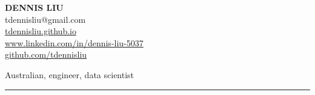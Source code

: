 \documentclass{article}
\newcommand{\HRule}{\rule{\linewidth}{0.5mm}}
\begin{document}
\begin{center} 

\textbf{\huge{DENNIS LIU}}
\\[0.5cm]

tdennisliu@gmail.com \\
\url{tdennisliu.github.io}\\
\small{\url{www.linkedin.com/in/dennis-liu-5037}} \\
\small{\url{github.com/tdennisliu}}

\end{center}
\begin{flushright}
Australian, engineer, data scientist 	
\end{flushright}



\HRule
\end{document}
